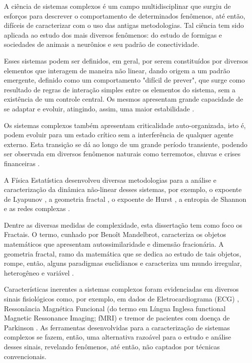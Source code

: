 \documentclass{ufscThesis}
\begin{document}
A ciência de sistemas complexos é um campo multidisciplinar que surgiu de esforços para descrever o comportamento de determinados fenômenos, até então, difíceis de caracterizar com o uso das antigas metodologias. Tal ciência tem sido aplicada ao estudo dos mais diversos fenômenos: do estudo de formigas e sociedades de animais a neurônios e seu padrão de conectividade. \par
Esses sistemas podem ser definidos, em geral, por serem constituídos por diversos elementos que interagem de maneira não linear, dando origem a um padrão emergente, definido como um comportamento "difícil de prever", que surge como resultado de regras de interação simples entre os elementos do sistema, sem a existência de um controle central. Os mesmos apresentam grande capacidade de se adaptar e evoluir, atingindo, assim, uma maior estabilidade \cite{Mitchell2009}. \par
Os sistemas complexos também apresentam criticalidade auto-organizada, isto é, podem evoluir para um estado crítico sem a interferência de qualquer agente externo. Esta transição se dá ao longo de um grande período transiente, podendo ser observada em diversos fenômenos naturais como terremotos, chuvas e crises financeiras \cite{Bak1996}. \par
A Física Estatística desenvolveu diversas metodologias para a análise e caracterização da dinâmica não-linear desses sistemas, por exemplo, o expoente de Lyapunov \cite{Wolf1985}, a geometria fractal \cite{feder1988fractals}, o expoente de Hurst \cite{Peng1995,Stanley1999}, a entropia de Shannon \cite{shannon1948} e as redes complexas \cite{Barabasi2002}. \par
Dentre as diversas medidas de complexidade, esta dissertação tem como foco os Fractais. O termo, cunhado por Benoît Mandelbrot, caracteriza os objetos matemáticos que apresentam autossimilaridade e dimensão fracionária. A geometria fractal, ramo da matemática que se dedica ao estudo de tais objetos, rompe, então, alguns paradigmas euclidianos e caracteriza um mundo irregular, heterogêneo e variável \cite{feder1988fractals,mandelbrot1983fractal}. \par
Características inerentes a sistemas complexos foram evidenciadas em diversos sinais fisiológicos como, por exemplo, em dados de Eletrocardiograma (ECG) \cite{Kresh1998,Vikman1999,Peng1995,Stanley1999,Ivanov1999}, Ressonância Magnética Funcional (do termo em Língua Inglesa functional Magnetic Ressonance Imaging; fMRI) \cite{R.Chialvo2004,Eguiluz2005} e tremor de pacientes com doença de Parkinson \cite{Figueiredo2013}. As ferramentas desenvolvidas para a caracterização de sistemas complexos se fazem, então, uma alternativa razoável para o estudo e análise desses sinais, revelando fenômenos, até então, não captados por técnicas convencionais.\par
\end{document}
